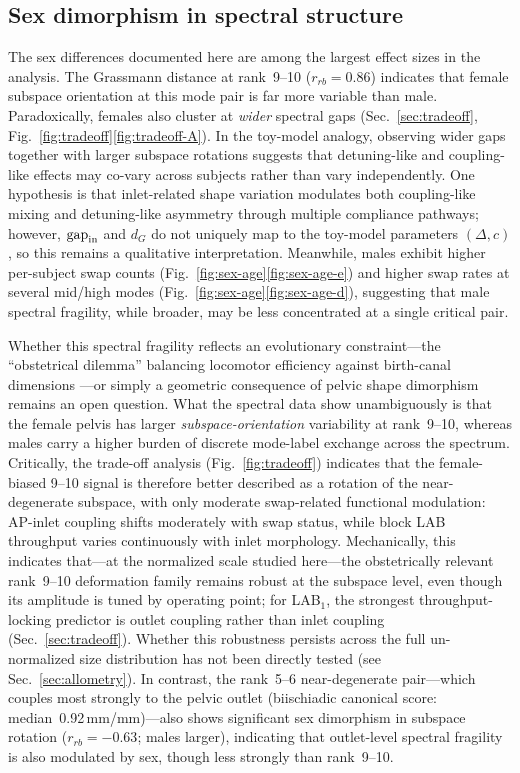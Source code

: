 \documentclass[11pt]{article}
\begin{document}
\subsection*{Sex dimorphism in spectral structure}
The sex differences documented here are among the largest effect sizes in the analysis.
The Grassmann distance at rank~9--10 ($r_{rb} = 0.86$) indicates that female subspace orientation at this mode pair is far more variable than male.
Paradoxically, females also cluster at \emph{wider} spectral gaps (Sec.~\ref{sec:tradeoff}, Fig.~\ref{fig:tradeoff}\ref{fig:tradeoff-A}).
In the toy-model analogy, observing wider gaps together with larger subspace rotations suggests that detuning-like and coupling-like effects may co-vary across subjects rather than vary independently.
One hypothesis is that inlet-related shape variation modulates both coupling-like mixing and detuning-like asymmetry through multiple compliance pathways; however, $\mathrm{gap}_{\rm in}$ and $d_G$ do not uniquely map to the toy-model parameters $(\Delta,c)$, so this remains a qualitative interpretation.
Meanwhile, males exhibit higher per-subject swap counts (Fig.~\ref{fig:sex-age}\ref{fig:sex-age-e}) and higher swap rates at several mid/high modes (Fig.~\ref{fig:sex-age}\ref{fig:sex-age-d}), suggesting that male spectral fragility, while broader, may be less concentrated at a single critical pair.

Whether this spectral fragility reflects an evolutionary constraint---the ``obstetrical dilemma'' balancing locomotor efficiency against birth-canal dimensions \citep{Washburn1960,Whitcome2017}---or simply a geometric consequence of pelvic shape dimorphism remains an open question.
What the spectral data show unambiguously is that the female pelvis has larger \emph{subspace-orientation} variability at rank~9--10, whereas males carry a higher burden of discrete mode-label exchange across the spectrum.
Critically, the trade-off analysis (Fig.~\ref{fig:tradeoff}) indicates that the female-biased 9--10 signal is therefore better described as a rotation of the near-degenerate subspace, with only moderate swap-related functional modulation: AP-inlet coupling shifts moderately with swap status, while block LAB throughput varies continuously with inlet morphology.
Mechanically, this indicates that---at the normalized scale studied here---the obstetrically relevant rank~9--10 deformation family remains robust at the subspace level, even though its amplitude is tuned by operating point; for LAB$_1$, the strongest throughput-locking predictor is outlet coupling rather than inlet coupling (Sec.~\ref{sec:tradeoff}). Whether this robustness persists across the full un-normalized size distribution has not been directly tested (see Sec.~\ref{sec:allometry}).
In contrast, the rank~5--6 near-degenerate pair---which couples most strongly to the pelvic outlet (biischiadic canonical score: median~0.92\,mm/mm)---also shows significant sex dimorphism in subspace rotation ($r_{rb} = -0.63$; males larger), indicating that outlet-level spectral fragility is also modulated by sex, though less strongly than rank~9--10.
\end{document}
